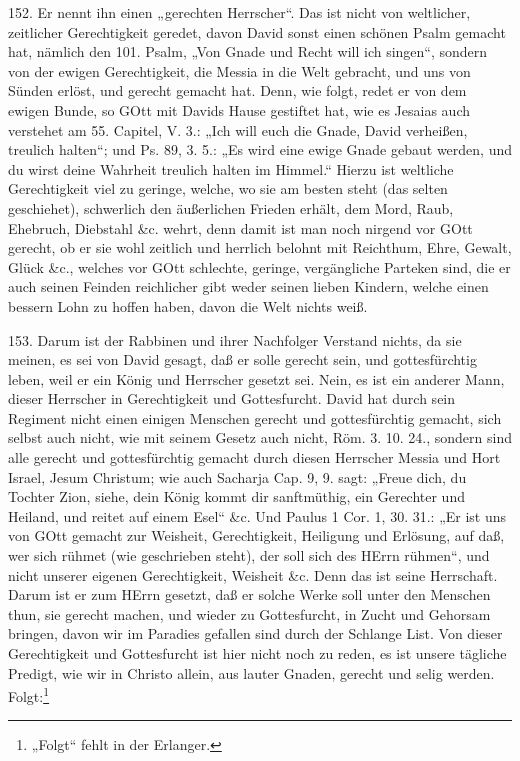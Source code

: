 152. Er nennt ihn einen „gerechten Herrscher“. Das ist nicht von weltlicher, zeitlicher Gerechtigkeit geredet, davon David sonst einen schönen Psalm gemacht hat, nämlich den 101. Psalm, „Von Gnade und Recht will ich singen“, sondern von der ewigen Gerechtigkeit, die Messia in die Welt gebracht, und uns von Sünden erlöst, und gerecht gemacht hat. Denn, wie folgt, redet er von dem ewigen Bunde, so GOtt mit Davids Hause gestiftet hat, wie es Jesaias auch verstehet am 55. Capitel, V. 3.: „Ich will euch die Gnade, David verheißen, treulich halten“; und Ps. 89, 3. 5.: „Es wird eine ewige Gnade gebaut werden, und du wirst deine Wahrheit treulich halten im Himmel.“ Hierzu ist weltliche Gerechtigkeit viel zu geringe, welche, wo sie am besten steht (das selten geschiehet), schwerlich den äußerlichen Frieden erhält, dem Mord, Raub, Ehebruch, Diebstahl \&c. wehrt, denn damit ist man noch nirgend vor GOtt gerecht, ob er sie wohl zeitlich und herrlich belohnt mit Reichthum, Ehre, Gewalt, Glück \&c., welches vor GOtt schlechte, geringe, vergängliche Parteken sind, die er auch seinen Feinden reichlicher gibt weder seinen lieben Kindern, welche einen bessern Lohn zu hoffen haben, davon die Welt nichts weiß.

153. Darum ist der Rabbinen und ihrer Nachfolger Verstand nichts, da sie meinen, es sei von David gesagt, daß er solle gerecht sein, und gottesfürchtig leben, weil er ein König und Herrscher gesetzt sei. Nein, es ist ein anderer Mann, dieser Herrscher in Gerechtigkeit und Gottesfurcht. David hat durch sein Regiment nicht einen einigen Menschen gerecht und gottesfürchtig gemacht, sich selbst auch nicht, wie mit seinem Gesetz auch nicht, Röm. 3. 10. 24., sondern sind alle gerecht und gottesfürchtig gemacht durch diesen Herrscher Messia und Hort Israel, Jesum Christum; wie auch Sacharja Cap. 9, 9. sagt: „Freue dich, du Tochter Zion, siehe, dein König kommt dir sanftmüthig, ein Gerechter und Heiland, und reitet auf einem Esel“ \&c. Und Paulus 1 Cor. 1, 30. 31.: „Er ist uns von GOtt gemacht zur Weisheit, Gerechtigkeit, Heiligung und Erlösung, auf daß, wer sich rühmet (wie geschrieben steht), der soll sich des HErrn rühmen“, und nicht unserer eigenen Gerechtigkeit, Weisheit \&c. Denn das ist seine Herrschaft. Darum ist er zum HErrn gesetzt, daß er solche Werke soll unter den Menschen thun, sie gerecht machen, und wieder zu Gottesfurcht, in Zucht und Gehorsam bringen, davon wir im Paradies gefallen sind durch der Schlange List. Von dieser Gerechtigkeit und Gottesfurcht ist hier nicht noch zu reden, es ist unsere tägliche Predigt, wie wir in Christo allein, aus lauter Gnaden, gerecht und selig werden. Folgt:\footnote{„Folgt“ fehlt in der Erlanger.}

